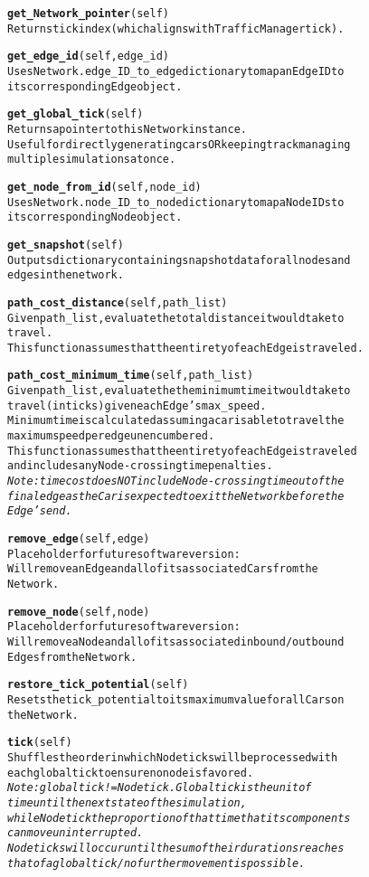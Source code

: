 \begin{alltt}
\textbf{get_Network_pointer}(self)
Returns tick index (which aligns with TrafficManager tick).

\textbf{get_edge_id}(self, edge_id)
Uses Network.edge_ID_to_edge dictionary to map an Edge ID to 
its corresponding Edge object.

\textbf{get_global_tick}(self)
Returns a pointer to this Network instance.
Useful for directly generating cars OR keeping track managing 
multiple simulations at once.

\textbf{get_node_from_id}(self, node_id)
Uses Network.node_ID_to_node dictionary to map a Node IDs to 
its corresponding Node object.

\textbf{get_snapshot}(self)
Outputs dictionary containing snapshot data for all nodes and 
edges in the network.

\textbf{path_cost_distance}(self, path_list)
Given path_list, evaluate the total distance it would take to 
travel.
This function assumes that the entirety of each Edge is traveled.

\textbf{path_cost_minimum_time}(self, path_list)
Given path_list, evaluate the the minimum time it would take to 
travel (in ticks) given each Edge's max_speed.
Minimum time is calculated assuming a car is able to travel the 
maximum speed per edge unencumbered.
This function assumes that the entirety of each Edge is traveled 
and includes any Node-crossing time penalties.
\textit{Note:  time cost does NOT include Node-crossing time out of the 
final edge as the Car is expected to exit the Network before the 
Edge's end.}

\textbf{remove_edge}(self, edge)
Placeholder for future software version:
Will remove an Edge and all of its associated Cars from the 
Network.

\textbf{remove_node}(self, node)
Placeholder for future software version:
Will remove a Node and all of its associated inbound/outbound 
Edges from the Network.

\textbf{restore_tick_potential}(self)
Resets the tick_potential to its maximum value for all Cars on 
the Network.

\textbf{tick}(self)
Shuffles the order in which Node ticks will be processed with 
each global tick to ensure no node is favored.
\textit{Note:  global tick != Node tick.  Global tick is the unit of 
time until the next state of the simulation, 
while Node tick the proportion of that time that its components 
can move uninterrupted.  
Node ticks will occur until the sum of their durations reaches 
that of a global tick/no further movement is possible.}

\end{alltt}


